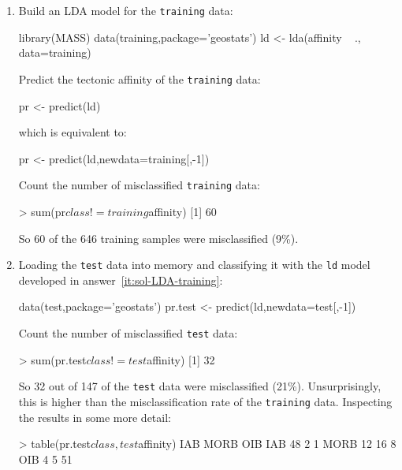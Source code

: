 \begin{enumerate}

\item\label{it:sol-LDA-training} Build an LDA model for the
  \texttt{training} data:

\begin{script}
library(MASS)
data(training,package='geostats')
ld <- lda(affinity ~ ., data=training)
\end{script}

Predict the tectonic affinity of the \texttt{training} data:

\begin{script}[firstnumber=4]
pr <- predict(ld)
\end{script}

\noindent which is equivalent to:

\begin{script}[firstnumber=4]
pr <- predict(ld,newdata=training[,-1])
\end{script}

Count the number of misclassified \texttt{training} data:

\begin{console}
> sum(pr$class != training$affinity)
[1] 60
\end{console}

So 60 of the 646 training samples were misclassified (9\%).

\item\label{it:sol-LDA-test} Loading the \texttt{test} data into
  memory and classifying it with the \texttt{ld} model developed in
  answer~\ref{it:sol-LDA-training}:

\begin{script}
data(test,package='geostats')
pr.test <- predict(ld,newdata=test[,-1])
\end{script}

Count the number of misclassified \texttt{test} data:

\begin{console}
> sum(pr.test$class != test$affinity)
[1] 32
\end{console}

So 32 out of 147 of the \texttt{test} data were misclassified (21\%).
Unsurprisingly, this is higher than the misclassification rate of the
\texttt{training} data. Inspecting the results in some more detail:

\begin{console}
> table(pr.test$class,test$affinity)
       IAB MORB OIB
  IAB   48    2   1
  MORB  12   16   8
  OIB    4    5  51
\end{console}


\end{enumerate}
